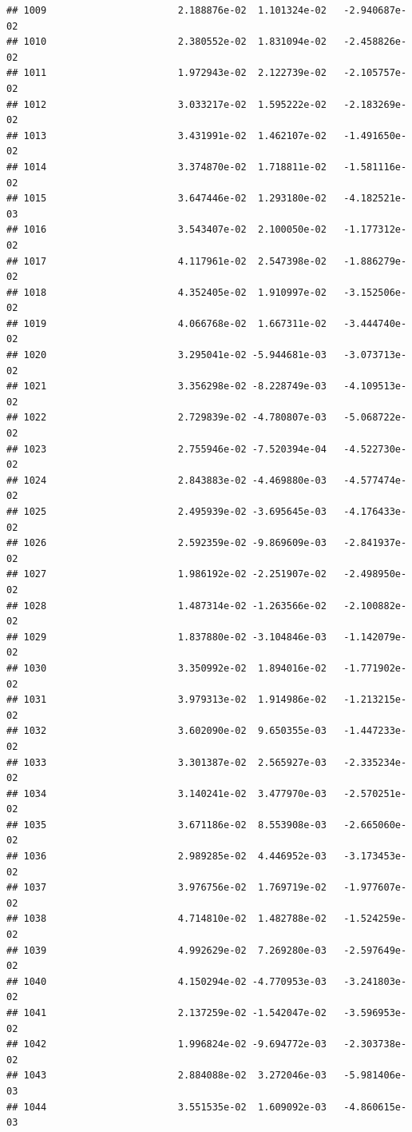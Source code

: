 \documentclass[
]{article}
\begin{document}
\begin{verbatim}
## 1009                       2.188876e-02  1.101324e-02   -2.940687e-02
## 1010                       2.380552e-02  1.831094e-02   -2.458826e-02
## 1011                       1.972943e-02  2.122739e-02   -2.105757e-02
## 1012                       3.033217e-02  1.595222e-02   -2.183269e-02
## 1013                       3.431991e-02  1.462107e-02   -1.491650e-02
## 1014                       3.374870e-02  1.718811e-02   -1.581116e-02
## 1015                       3.647446e-02  1.293180e-02   -4.182521e-03
## 1016                       3.543407e-02  2.100050e-02   -1.177312e-02
## 1017                       4.117961e-02  2.547398e-02   -1.886279e-02
## 1018                       4.352405e-02  1.910997e-02   -3.152506e-02
## 1019                       4.066768e-02  1.667311e-02   -3.444740e-02
## 1020                       3.295041e-02 -5.944681e-03   -3.073713e-02
## 1021                       3.356298e-02 -8.228749e-03   -4.109513e-02
## 1022                       2.729839e-02 -4.780807e-03   -5.068722e-02
## 1023                       2.755946e-02 -7.520394e-04   -4.522730e-02
## 1024                       2.843883e-02 -4.469880e-03   -4.577474e-02
## 1025                       2.495939e-02 -3.695645e-03   -4.176433e-02
## 1026                       2.592359e-02 -9.869609e-03   -2.841937e-02
## 1027                       1.986192e-02 -2.251907e-02   -2.498950e-02
## 1028                       1.487314e-02 -1.263566e-02   -2.100882e-02
## 1029                       1.837880e-02 -3.104846e-03   -1.142079e-02
## 1030                       3.350992e-02  1.894016e-02   -1.771902e-02
## 1031                       3.979313e-02  1.914986e-02   -1.213215e-02
## 1032                       3.602090e-02  9.650355e-03   -1.447233e-02
## 1033                       3.301387e-02  2.565927e-03   -2.335234e-02
## 1034                       3.140241e-02  3.477970e-03   -2.570251e-02
## 1035                       3.671186e-02  8.553908e-03   -2.665060e-02
## 1036                       2.989285e-02  4.446952e-03   -3.173453e-02
## 1037                       3.976756e-02  1.769719e-02   -1.977607e-02
## 1038                       4.714810e-02  1.482788e-02   -1.524259e-02
## 1039                       4.992629e-02  7.269280e-03   -2.597649e-02
## 1040                       4.150294e-02 -4.770953e-03   -3.241803e-02
## 1041                       2.137259e-02 -1.542047e-02   -3.596953e-02
## 1042                       1.996824e-02 -9.694772e-03   -2.303738e-02
## 1043                       2.884088e-02  3.272046e-03   -5.981406e-03
## 1044                       3.551535e-02  1.609092e-03   -4.860615e-03

\end{verbatim}
\end{document}
